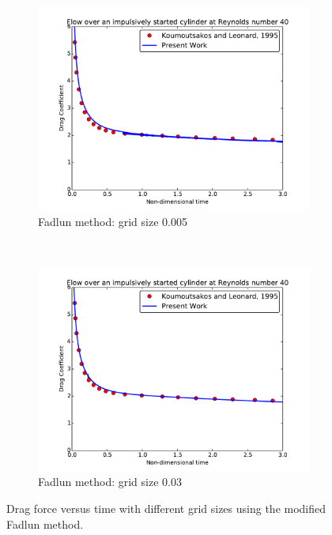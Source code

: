 \begin{figure}[!htb]
	\centering
	\begin{subfigure}{0.48\textwidth}
		\includegraphics[width=\linewidth]{fadlun005}
		\caption{Fadlun method: grid size 0.005}
	\end{subfigure}
	~
	\begin{subfigure}{0.48\textwidth}
			\includegraphics[width=\linewidth]{fadlun03}
			\caption{Fadlun method: grid size 0.03}
	\end{subfigure}
	\caption{Drag force versus time with different grid sizes using the modified Fadlun method.}
	\label{fig:fadlun005}
\end{figure}

